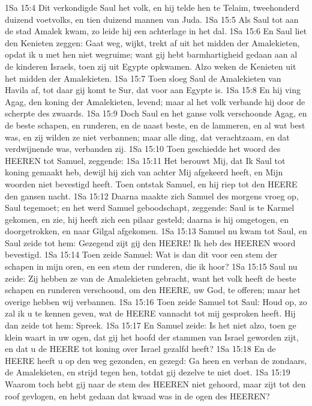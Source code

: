 1Sa 15:4  Dit verkondigde Saul het volk, en hij telde hen te Telaim, tweehonderd duizend voetvolks, en tien duizend mannen van Juda.
1Sa 15:5  Als Saul tot aan de stad Amalek kwam, zo leide hij een achterlage in het dal.
1Sa 15:6  En Saul liet den Kenieten zeggen: Gaat weg, wijkt, trekt af uit het midden der Amalekieten, opdat ik u met hen niet wegruime; want gij hebt barmhartigheid gedaan aan al de kinderen Israels, toen zij uit Egypte opkwamen. Alzo weken de Kenieten uit het midden der Amalekieten.
1Sa 15:7  Toen sloeg Saul de Amalekieten van Havila af, tot daar gij komt te Sur, dat voor aan Egypte is.
1Sa 15:8  En hij ving Agag, den koning der Amalekieten, levend; maar al het volk verbande hij door de scherpte des zwaards.
1Sa 15:9  Doch Saul en het ganse volk verschoonde Agag, en de beste schapen, en runderen, en de naast beste, en de lammeren, en al wat best was, en zij wilden ze niet verbannen; maar alle ding, dat verachtzaam, en dat verdwijnende was, verbanden zij.
1Sa 15:10  Toen geschiedde het woord des HEEREN tot Samuel, zeggende:
1Sa 15:11  Het berouwt Mij, dat Ik Saul tot koning gemaakt heb, dewijl hij zich van achter Mij afgekeerd heeft, en Mijn woorden niet bevestigd heeft. Toen ontstak Samuel, en hij riep tot den HEERE den gansen nacht.
1Sa 15:12  Daarna maakte zich Samuel des morgens vroeg op, Saul tegemoet; en het werd Samuel geboodschapt, zeggende: Saul is te Karmel gekomen, en zie, hij heeft zich een pilaar gesteld; daarna is hij omgetogen, en doorgetrokken, en naar Gilgal afgekomen.
1Sa 15:13  Samuel nu kwam tot Saul, en Saul zeide tot hem: Gezegend zijt gij den HEERE! Ik heb des HEEREN woord bevestigd.
1Sa 15:14  Toen zeide Samuel: Wat is dan dit voor een stem der schapen in mijn oren, en een stem der runderen, die ik hoor?
1Sa 15:15  Saul nu zeide: Zij hebben ze van de Amalekieten gebracht, want het volk heeft de beste schapen en runderen verschoond, om den HEERE, uw God, te offeren; maar het overige hebben wij verbannen.
1Sa 15:16  Toen zeide Samuel tot Saul: Houd op, zo zal ik u te kennen geven, wat de HEERE vannacht tot mij gesproken heeft. Hij dan zeide tot hem: Spreek.
1Sa 15:17  En Samuel zeide: Is het niet alzo, toen ge klein waart in uw ogen, dat gij het hoofd der stammen van Israel geworden zijt, en dat u de HEERE tot koning over Israel gezalfd heeft?
1Sa 15:18  En de HEERE heeft u op den weg gezonden, en gezegd: Ga heen en verban de zondaars, de Amalekieten, en strijd tegen hen, totdat gij dezelve te niet doet.
1Sa 15:19  Waarom toch hebt gij naar de stem des HEEREN niet gehoord, maar zijt tot den roof gevlogen, en hebt gedaan dat kwaad was in de ogen des HEEREN?
